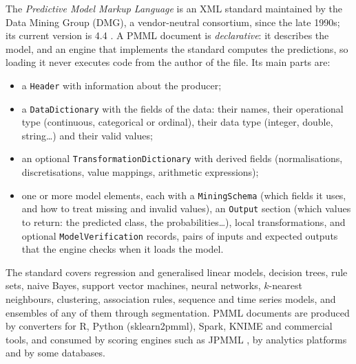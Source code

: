 The \emph{Predictive Model Markup Language} is an XML standard maintained by the Data Mining Group (DMG),
a vendor-neutral consortium, since the late 1990s; its current version is 4.4 \citep{dmg2019pmml,guazzelli2009pmml}.
A PMML document is \emph{declarative}: it describes the model, and an engine that implements the standard
computes the predictions, so loading it never executes code from the author of the file. Its main parts
are:
\begin{itemize}
  \item a \texttt{Header} with information about the producer;
  \item a \texttt{DataDictionary} with the fields of the data: their names, their operational type
        (continuous, categorical or ordinal), their data type (integer, double, string\dots) and their valid
        values;
  \item an optional \texttt{TransformationDictionary} with derived fields (normalisations,
        discretisations, value mappings, arithmetic expressions);
  \item one or more model elements, each with a \texttt{MiningSchema} (which fields it uses, and how to
        treat missing and invalid values), an \texttt{Output} section (which values to return: the
        predicted class, the probabilities\dots), local transformations, and optional
        \texttt{ModelVerification} records, pairs of inputs and expected outputs that the engine checks
        when it loads the model.
\end{itemize}
The standard covers regression and generalised linear models, decision trees, rule sets, naive Bayes,
support vector machines, neural networks, $k$-nearest neighbours, clustering, association rules, sequence
and time series models, and ensembles of any of them through segmentation. PMML documents are produced by
converters for R, Python (sklearn2pmml), Spark, KNIME and commercial tools, and consumed by scoring
engines such as JPMML \citep{jpmml}, by analytics platforms and by some databases.

